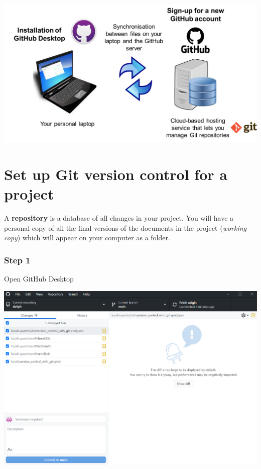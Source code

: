 \documentclass[
  letterpaper,
  DIV=11,
  numbers=noendperiod,
  oneside]{scrreprt}
\begin{document}
\includegraphics{./images/paste-081F7F03.png}

\hypertarget{set-up-git-version-control-for-a-project}{%
\section{Set up Git version control for a
project}\label{set-up-git-version-control-for-a-project}}

\begin{tcolorbox}[enhanced jigsaw, colbacktitle=quarto-callout-note-color!10!white, titlerule=0mm, breakable, opacityback=0, opacitybacktitle=0.6, left=2mm, coltitle=black, colback=white, title=\textcolor{quarto-callout-note-color}{\faInfo}\hspace{0.5em}{Note}, rightrule=.15mm, colframe=quarto-callout-note-color-frame, toprule=.15mm, bottomtitle=1mm, toptitle=1mm, arc=.35mm, bottomrule=.15mm, leftrule=.75mm]
A \textbf{repository} is a database of all changes in your project. You
will have a personal copy of all the final versions of the documents in
the project (\emph{working copy}) which will appear on your computer as
a folder.
\end{tcolorbox}

\hypertarget{step-1}{%
\subsubsection{Step 1}\label{step-1}}

Open GitHub Desktop

\includegraphics{./images/paste-EFF40D72.png}
\end{document}
